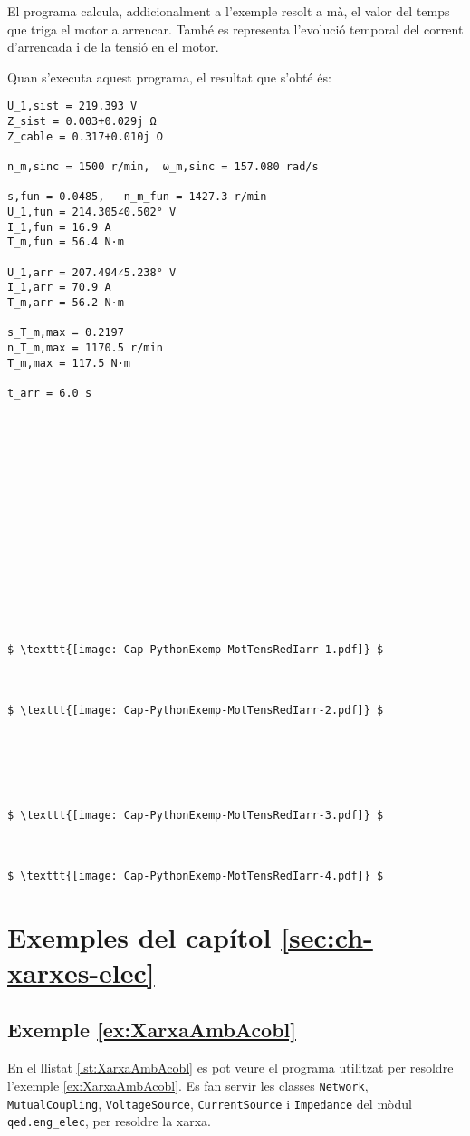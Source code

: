 El programa calcula, addicionalment a l'exemple resolt a mà, el valor  del temps que triga el motor a arrencar. També es representa l'evolució temporal del  corrent d'arrencada i de la tensió en el motor.

Quan s'executa aquest programa, el resultat que s'obté és:
\lstset{
	language=,
	numbers=none,
	frame=none
}
\begin{lstlisting}[mathescape=true]
U_1,sist = 219.393 V
Z_sist = 0.003+0.029j Ω
Z_cable = 0.317+0.010j Ω

n_m,sinc = 1500 r/min,  ω_m,sinc = 157.080 rad/s

s,fun = 0.0485,   n_m_fun = 1427.3 r/min
U_1,fun = 214.305∠0.502° V
I_1,fun = 16.9 A
T_m,fun = 56.4 N·m

U_1,arr = 207.494∠5.238° V
I_1,arr = 70.9 A
T_m,arr = 56.2 N·m

s_T_m,max = 0.2197
n_T_m,max = 1170.5 r/min
T_m,max = 117.5 N·m

t_arr = 6.0 s
















$ \texttt{[image: Cap-PythonExemp-MotTensRedIarr-1.pdf]} $



$ \texttt{[image: Cap-PythonExemp-MotTensRedIarr-2.pdf]} $






$ \texttt{[image: Cap-PythonExemp-MotTensRedIarr-3.pdf]} $



$ \texttt{[image: Cap-PythonExemp-MotTensRedIarr-4.pdf]} $
\end{lstlisting} 




\section{Exemples del capítol \ref*{sec:ch-xarxes-elec}}

\hypertarget{exemple:XarxaAmbAcobl}{\subsection{Exemple \ref*{ex:XarxaAmbAcobl} \XarxaAmbAcobl}}
En el llistat \vref{lst:XarxaAmbAcobl} es pot veure el programa utilitzat per resoldre l'exemple \vref{ex:XarxaAmbAcobl}. Es fan servir les classes \texttt{Network}, \texttt{MutualCoupling}, \texttt{VoltageSource}, \texttt{CurrentSource} i \texttt{Impedance} del mòdul \texttt{qed.eng\_elec},  per resoldre la xarxa.


